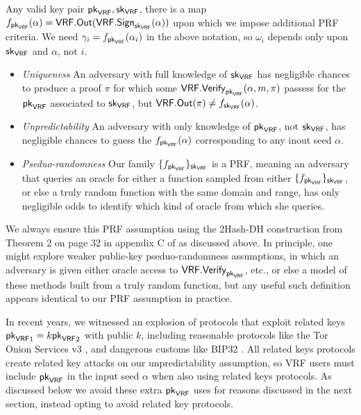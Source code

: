 Any valid key pair $\mathsf{pk}_{\mathsf{VRF}},\mathsf{sk}_{\mathsf{VRF}}$, there is a map $f_{\mathsf{pk}_{\mathsf{VRF}}}(\alpha) = \mathsf{VRF}.\mathsf{Out}(\mathsf{VRF}.\mathsf{Sign}_{\mathsf{sk}_{\mathsf{VRF}}}(\alpha))$ upon which we impose additional PRF criteria.  We need $\gamma_i = f_{\mathsf{pk}_{\mathsf{VRF}}}(\alpha_i)$ in the above notation, so $\omega_i$ depends only upon $\mathsf{sk}_{\mathsf{VRF}}$ and $\alpha$, not $i$.
\begin{itemize}
\item {\em Uniqueness}
An adversary with full knowledge of $\mathsf{sk}_{\mathsf{VRF}}$ has negligible chances to produce a proof $\pi$ for which some $\mathsf{VRF}.\mathsf{Verify}_{\mathsf{pk}_{\mathsf{VRF}}}(\alpha,m,\pi)$ passess for the $\mathsf{pk}_{\mathsf{VRF}}$ associated to $\mathsf{sk}_{\mathsf{VRF}}$, but $\mathsf{VRF}.\mathsf{Out}(\pi) \ne f_{\mathsf{sk}_{\mathsf{VRF}}}(\alpha)$.
\item {\em Unpredictability}
An adversary with only knowledge of $\mathsf{pk}_{\mathsf{VRF}}$, not $\mathsf{sk}_{\mathsf{VRF}}$, has negligible chances to guess the $f_{\mathsf{pk}_{\mathsf{VRF}}}(\alpha)$ corresponding to any inout seed $\alpha$.
\item {\em Pseduo-randomness}
Our family $\{ f_{\mathsf{pk}_{\mathsf{VRF}}} \}_{\mathsf{sk}_{\mathsf{VRF}}}$ is a PRF, meaning an adversary that queries an oracle for either a function sampled from either $\{ f_{\mathsf{pk}_{\mathsf{VRF}}} \}_{\mathsf{sk}_{\mathsf{VRF}}}$, or else a truly random function with the same domain and range, has only negligible odds to identify which kind of oracle from which she queries.
\end{itemize}
We always ensure this PRF assumption using the 2Hash-DH construction from Theorem 2 on page 32 in appendix C of \cite{Praos} as discussed above.
In principle, one might explore weaker public-key pseduo-randomness assumptions, in which an adversary is given either oracle access to $\mathsf{VRF}.\mathsf{Verify}_{\mathsf{pk}_{\mathsf{VRF}}}$, etc., or else a model of these methods built from a truly random function, but any useful such definition appears identical to our PRF assumption in practice.

In recent years, we witnessed an explosion of protocols that exploit related keys ${\mathsf{pk}_{\mathsf{VRF}}}_1 = k {\mathsf{pk}_{\mathsf{VRF}}}_2$ with public $k$, including reasonable protocols like the Tor Onion Services v3 \cite{TorRendSpecV3}, and dangerous customs like BIP32 \cite{BIP32}.  All related keys protocols create related key attacks on our unpredictability assumption, so VRF users must include $\mathsf{pk}_{\mathsf{VRF}}$ in the input seed $\alpha$ when also using related keys protocols.  As discussed below we avoid these extra $\mathsf{pk}_{\mathsf{VRF}}$ uses for reasons discussed in the next section, instead opting to avoid related key protocols.

